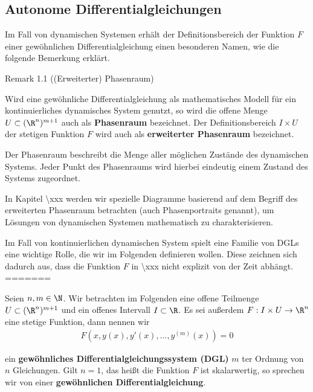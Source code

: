 \documentclass[letterpaper,10pt,english]{jupyterBook}
\begin{document}
\subsection{Autonome Differentialgleichungen}
\label{\detokenize{ode/repetition:autonome-differentialgleichungen}}
Im Fall von dynamischen Systemen erhält der Definitionsbereich der Funktion \(F\) einer gewöhnlichen Differentialgleichung einen besonderen Namen, wie die folgende Bemerkung erklärt.
\label{ode/repetition:remark-1}
\begin{emphBox}{}{}{Remark 1.1 ((Erweiterter) Phasenraum)}



Wird eine gewöhnliche Differentialgleichung als mathematisches Modell für ein kontinuierliches dynamisches System genutzt, so wird die offene Menge \(U\subset (\R^n)^{m+1}\) auch als \textbf{Phasenraum} bezeichnet.
Der Definitionsbereich \(I\times U\) der stetigen Funktion \(F\) wird auch als \textbf{erweiterter Phasenraum} bezeichnet.

Der Phasenraum beschreibt die Menge aller möglichen Zustände des dynamischen Systems.
Jeder Punkt des Phasenraums wird hierbei eindeutig einem Zustand des Systems zugeordnet.

In Kapitel \textbackslash{}xxx werden wir spezielle Diagramme basierend auf dem Begriff des erweiterten Phasenraum betrachten (auch Phasenportraits genannt), um Lösungen von dynamischen Systemen mathematisch zu charakterisieren.
\end{emphBox}

Im Fall von kontinuierlichen dynamischen System spielt eine Familie von DGLs eine wichtige Rolle, die wir im Folgenden definieren wollen.
Diese zeichnen sich dadurch aus, dass die Funktion \(F\) in \textbackslash{}xxx nicht explizit von der Zeit abhängt.
\label{ode/repetition:definition-2}
=======
\par
Seien \(n,m \in \N\).
Wir betrachten im Folgenden eine offene Teilmenge \(U\subset (\R^n)^{m+1}\) und ein offenes Intervall \(I\subset\R\).
Es sei außerdem \(F:I\times U\rightarrow\R^n\) eine stetige Funktion, dann nennen wir
\begin{align}\label{equation:ode/repetition:eq:DGL}
F(x,y(x),y'(x),\ldots,y^{(m)}(x)) = 0
\end{align}
\par
ein \textbf{gewöhnliches Differentialgleichungssystem (DGL)} \(m\) ter Ordnung von \(n\) Gleichungen.
Gilt \(n=1\), das heißt die Funktion \(F\) ist skalarwertig, so sprechen wir von einer \textbf{gewöhnlichen Differentialgleichung}.
\end{document}

